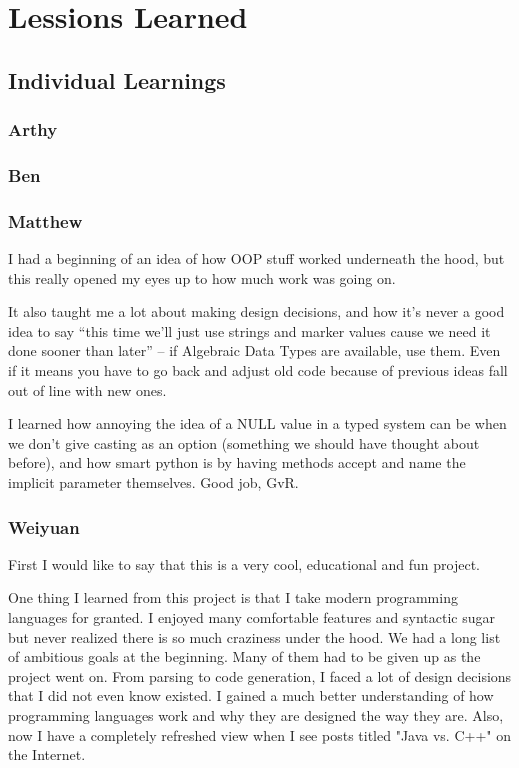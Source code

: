 \section{Lessions Learned}
\subsection{Individual Learnings}
\subsubsection*{Arthy}

\subsubsection*{ Ben}

\subsubsection*{ Matthew}
I had a beginning of an idea of how OOP stuff worked underneath the hood, but this really opened my eyes up to how much work was going on.

It also taught me a lot about making design decisions, and how it's never a good idea to say ``this time we'll just use strings and marker values cause we need it done sooner than later'' -- if Algebraic Data Types are available, use them. Even if it means you 
have to go back and adjust old code because of previous ideas fall out of line with new ones.

I learned how annoying the idea of a NULL value in a typed system can be when we don't give casting as an option (something we should have thought about before), and how smart python is by having methods accept and name the implicit parameter themselves. Good 
job, GvR.

\subsubsection*{Weiyuan}
First I would like to say that this is a very cool, educational and fun project. 

One thing I learned from this project is that I take modern programming languages for granted. I enjoyed many comfortable features and syntactic sugar but never realized there is so much craziness under the hood. We had a long list of ambitious goals at the beginning. Many of them had to be given up as the project went on. From parsing to code generation, I faced a lot of design decisions that I did not even know existed. I gained a much better understanding of how programming languages work and why they are designed the way they are. Also, now I have a completely refreshed view when I see posts titled "Java vs. C++" on the Internet.

